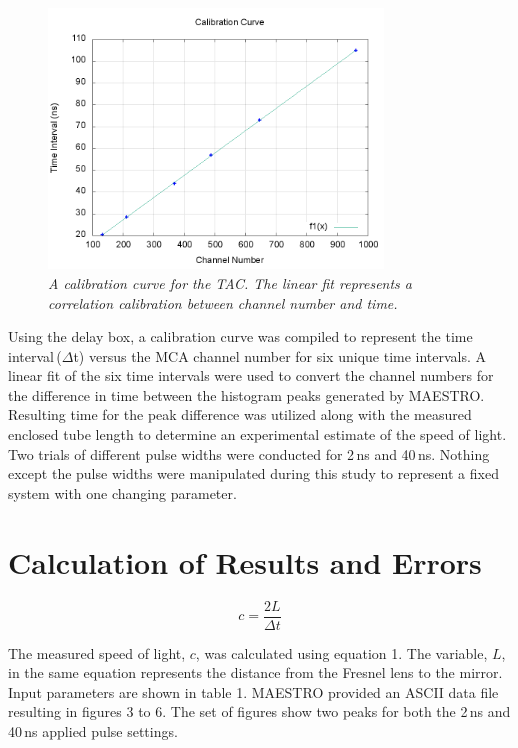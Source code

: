 \documentclass[aps,prl,twocolumn,superscriptaddress,nofootinbib]{revtex4-1}
\begin{document}
\begin{figure}[h!]
  \begin{center}
\centerline{\includegraphics[width=3.5in]{calib.png}}
\caption{\it \small{A calibration curve for the TAC. The linear fit represents a correlation calibration between channel number and time. \label{fig1}}}
  \end{center}
\end{figure}

Using the delay box, a calibration curve was compiled to represent the time interval\,($\Delta$t) versus the MCA channel number for six unique time intervals. A linear fit of the six time intervals were used to convert the channel numbers for the difference in time between the histogram peaks generated by MAESTRO. Resulting time for the peak difference was utilized along with the measured enclosed tube length to determine an experimental estimate of the speed of light.
\\
\indent Two trials of different pulse widths were conducted for 2\,ns and 40\,ns. Nothing except the pulse widths were manipulated during this study to represent a fixed system with one changing parameter.





\section{Calculation of Results and Errors}

\begin{equation}
c = \frac{2L}{\Delta t}
\end{equation}

The measured speed of light, $c$, was calculated using equation 1. The variable, $L$, in the same equation represents the distance from the Fresnel lens to the mirror. Input parameters are shown in table 1. MAESTRO provided an ASCII data file resulting in figures 3 to 6. The set of figures show two peaks for both the 2\,ns and 40\,ns applied pulse settings.
\vfill\eject
\end{document}
